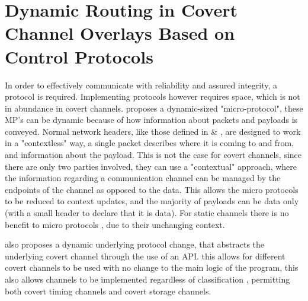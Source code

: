 \section{Dynamic Routing in Covert Channel Overlays Based on Control Protocols}
\label{sec:DRiCCBoCP}

In order to effectively communicate with reliability and assured integrity, a protocol is required. Implementing protocols however requires space, which is not in abundance in covert channels. \cite{DRiCCBoCP} proposes a dynamic-sized "micro-protocol", these MP's can be dynamic because of how information about packets and payloads is conveyed. Normal network headers, like those defined in \cite{rfc791} \& \cite{Trfc793}, are designed to work in a "contextless" way, a single packet describes where it is coming to and from, and information about the payload. This is not the case for covert channels, since there are only two parties involved, they can use a "contextual" approach, where the information regarding a communication channel can be managed by the endpoints of the channel as opposed to the data. This allows the micro protocols to be reduced to context updates, and the majority of payloads can be data only (with a small header to declare that it is data). For static channels there is no benefit to micro protocols \citep{DRiCCBoCP}, due to their unchanging context.

\cite{DRiCCBoCP} also proposes a dynamic underlying protocol change, that abstracts the underlying covert channel through the use of an API. this allows for different covert channels to be used with no change to the main logic of the program, this also allows channels to be implemented regardless of classification \citep{DRiCCBoCP}, permitting both covert timing channels and covert storage channels.

